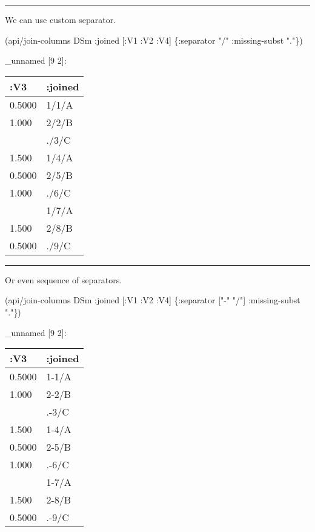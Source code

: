 \documentclass[]{article}
\newenvironment{Shaded}{\begin{snugshade}}{\end{snugshade}}
\newcommand{\StringTok}[1]{\textcolor[rgb]{0.31,0.60,0.02}{#1}}
\newcommand{\AttributeTok}[1]{\textcolor[rgb]{0.77,0.63,0.00}{#1}}
\newcommand{\NormalTok}[1]{#1}
\begin{document}
\begin{center}\rule{0.5\linewidth}{0.5pt}\end{center}

We can use custom separator.

\begin{Shaded}
\begin{Highlighting}[]
\NormalTok{(api/join-columns DSm }\AttributeTok{:joined}\NormalTok{ [}\AttributeTok{:V1} \AttributeTok{:V2} \AttributeTok{:V4}\NormalTok{] \{}\AttributeTok{:separator} \StringTok{"/"}
                                             \AttributeTok{:missing-subst} \StringTok{"."}\NormalTok{\})}
\end{Highlighting}
\end{Shaded}

\_unnamed {[}9 2{]}:

\begin{longtable}[]{@{}ll@{}}
\toprule
:V3 & :joined\tabularnewline
\midrule
\endhead
0.5000 & 1/1/A\tabularnewline
1.000 & 2/2/B\tabularnewline
& ./3/C\tabularnewline
1.500 & 1/4/A\tabularnewline
0.5000 & 2/5/B\tabularnewline
1.000 & ./6/C\tabularnewline
& 1/7/A\tabularnewline
1.500 & 2/8/B\tabularnewline
0.5000 & ./9/C\tabularnewline
\bottomrule
\end{longtable}

\begin{center}\rule{0.5\linewidth}{0.5pt}\end{center}

Or even sequence of separators.

\begin{Shaded}
\begin{Highlighting}[]
\NormalTok{(api/join-columns DSm }\AttributeTok{:joined}\NormalTok{ [}\AttributeTok{:V1} \AttributeTok{:V2} \AttributeTok{:V4}\NormalTok{] \{}\AttributeTok{:separator}\NormalTok{ [}\StringTok{"-"} \StringTok{"/"}\NormalTok{]}
                                             \AttributeTok{:missing-subst} \StringTok{"."}\NormalTok{\})}
\end{Highlighting}
\end{Shaded}

\_unnamed {[}9 2{]}:

\begin{longtable}[]{@{}ll@{}}
\toprule
:V3 & :joined\tabularnewline
\midrule
\endhead
0.5000 & 1-1/A\tabularnewline
1.000 & 2-2/B\tabularnewline
& .-3/C\tabularnewline
1.500 & 1-4/A\tabularnewline
0.5000 & 2-5/B\tabularnewline
1.000 & .-6/C\tabularnewline
& 1-7/A\tabularnewline
1.500 & 2-8/B\tabularnewline
0.5000 & .-9/C\tabularnewline
\bottomrule
\end{longtable}
\end{document}

